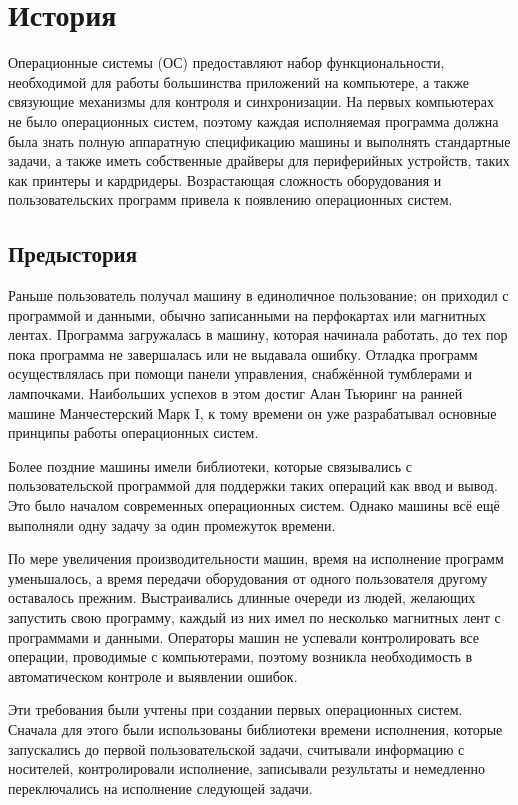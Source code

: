 \section{История}
Операционные системы (ОС) предоставляют набор функциональности, необходимой для работы большинства приложений на компьютере, а также связующие механизмы для контроля и синхронизации. На первых компьютерах не было операционных систем, поэтому каждая исполняемая программа должна была знать полную аппаратную спецификацию машины и выполнять стандартные задачи, а также иметь собственные драйверы для периферийных устройств, таких как принтеры и кардридеры. Возрастающая сложность оборудования и пользовательских программ привела к появлению операционных систем.

\subsection{Предыстория}
Раньше пользователь получал машину в единоличное пользование; он приходил с программой и данными, обычно записанными на перфокартах или магнитных лентах. Программа загружалась в машину, которая начинала работать, до тех пор пока программа не завершалась или не выдавала ошибку. Отладка программ осуществлялась при помощи панели управления, снабжённой тумблерами и лампочками. Наибольших успехов в этом достиг Алан Тьюринг на ранней машине Манчестерский Марк I, к тому времени он уже разрабатывал основные принципы работы операционных систем.

Более поздние машины имели библиотеки, которые связывались с пользовательской программой для поддержки таких операций как ввод и вывод. Это было началом современных операционных систем. Однако машины всё ещё выполняли одну задачу за один промежуток времени.

По мере увеличения производительности машин, время на исполнение программ уменьшалось, а время передачи оборудования от одного пользователя другому оставалось прежним. Выстраивались длинные очереди из людей, желающих запустить свою программу, каждый из них имел по несколько магнитных лент с программами и данными. Операторы машин не успевали контролировать все операции, проводимые с компьютерами, поэтому возникла необходимость в автоматическом контроле и выявлении ошибок.

Эти требования были учтены при создании первых операционных систем. Сначала для этого были использованы библиотеки времени исполнения, которые запускались до первой пользовательской задачи, считывали информацию с носителей, контролировали исполнение, записывали результаты и немедленно переключались на исполнение следующей задачи.

